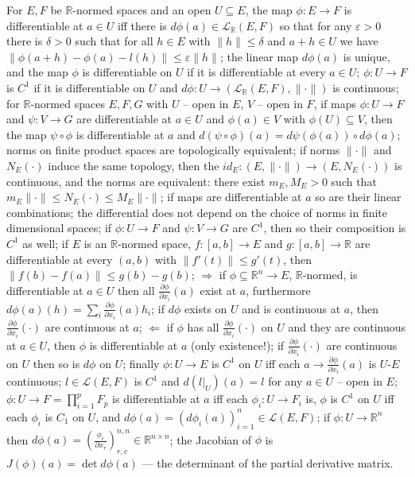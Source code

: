 \documentclass[a4paper]{article}
\newcommand{\Lcal}{\mathcal{L}}
\newcommand{\real}{\mathbb{R}}
\begin{document}
For $E, F$ be $\real$-normed spaces and an open $U\subseteq E$, the map $\phi\colon E\to F$
is differentiable at $a\in U$ iff there is $d\phi(a) \in \Lcal_\real(E, F)$ so that for any
$\varepsilon > 0$ there is $\delta > 0$ such that for all $h\in E$ with $\|h\| \leq \delta$
and $a + h \in U$ we have $\|\phi(a+h) - \phi(a) - l(h) \| \leq \varepsilon \|h\|$;
%
the linear map $d\phi(a)$ is unique, and the map $\phi$ is differentiable on $U$ if
it is differentiable at every $a\in U$;
%
$\phi\colon U \to F$ is $C^1$ if it is differentiable on $U$ and
$d\phi\colon U \to (\Lcal_\real(E, F), \|\cdot\|)$ is continuous;
%
for $\real$-normed spaces $E, F, G$ with $U$ -- open in $E$, $V$ -- open in $F$, if
maps $\phi\colon U\to F$ and $\psi\colon V\to G$ are differentiable at $a\in U$ and
$\phi(a)\in V$ with $\phi(U) \subseteq V$, then the map $\psi\circ \phi$ is differentiable
at $a$ and $d(\psi\circ\phi)(a) = d\psi(\phi(a)) \circ d\phi(a)$;
%
norms on finite product spaces are topologically equivalent;
%
if norms $\|\cdot\|$ and $N_E(\cdot)$ induce the same topology, then the
$id_E\colon (E, \|\cdot\|) \to (E, N_E(\cdot))$ is continuous, and the norms are equivalent:
there exist $m_E, M_E > 0$ such that $m_E\|\cdot\| \leq N_E(\cdot) \leq M_E \|\cdot\|$;
%
if maps are differentiable at $a$ so are their linear combinations;
%
the differential does not depend on the choice of norms in finite dimensional spaces;
%
if $\phi\colon U\to F$ and $\psi\colon V\to G$ are $C^1$, then so their composition is
$C^1$ as well;
%
if $E$ is an $\real$-normed space, $f\colon [a, b] \to E$ and $g\colon [a, b] \to \real$
are differentiable at every $(a, b)$ with $\|f'(t)\| \leq g'(t)$, then
$\|f(b) - f(a)\| \leq g(b) - g(b)$;
%
$\Rightarrow$ if $\phi\subseteq \real^n \to E$, $\real$-normed, is differentiable at
$a\in U$ then all $\tfrac{\partial \phi}{\partial x_i}(a)$ exist at $a$, furthermore
$d\phi(a)(h) = \sum_i \tfrac{\partial \phi}{\partial x_i}(a) h_i$;
%
if $d\phi$ exists on $U$ and is continuous at $a$, then
$\tfrac{\partial \phi}{\partial x_i}(\cdot)$ are continuous at $a$;
%
$\Leftarrow$ if $\phi$ has all $\tfrac{\partial \phi}{\partial x_i}(\cdot)$ on $U$ and
they are continuous at $a\in U$, then $\phi$ is differentiable at $a$ (only existence!);
%
if $\tfrac{\partial \phi}{\partial x_i}(\cdot)$ are continuous on $U$ then so is $d\phi$
on $U$;
%
finally $\phi\colon U\to E$ is $C^1$ on $U$ iff each
$a\to \tfrac{\partial \phi}{\partial x_i}(a)$ is $U$-$E$ continuous;
%
$l\in \Lcal(E, F)$ is $C^1$ and $d(l\big\vert_U)(a) = l$ for any $a\in U$ -- open in $E$;
%
$\phi\colon U \to F = \prod_{i=1}^p F_p$ is differentiable at $a$ iff each
$\phi_i\colon U\to F_i$ is, $\phi$ is $C^1$ on $U$ iff each $\phi_i$ is $C_1$ on $U$,
and $d\phi(a) = (d\phi_i(a))_{i=1}^n \in \Lcal(E, F)$;
%
if $\phi\colon U \to \real^n$ then
$d\phi(a) = (\tfrac{\phi_c}{\partial x_r})_{r,c}^{n,n} \in \real^{n\times n}$;
%
the Jacobian of $\phi$ is $J(\phi)(a) = \det d\phi(a)$ --- the determinant of the
partial derivative matrix.
\end{document}
